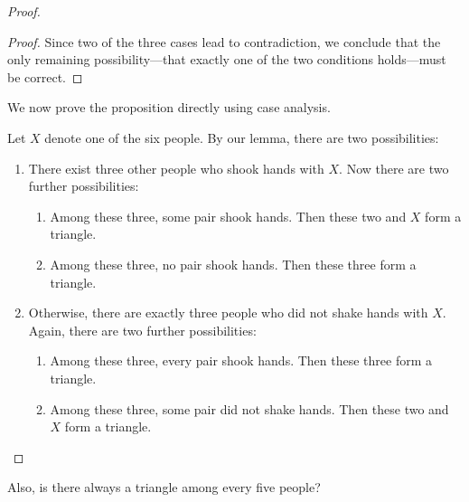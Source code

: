 \documentclass[twoside,12pt]{article}
\begin{document}
\begin{problem}{12}
{\begin{proof}
\begin{proof}
Since two of the three cases lead to contradiction, we conclude that the only remaining possibility---that exactly one of the two conditions holds---must be correct.
\end{proof}

We now prove the proposition directly using case analysis. 

Let $X$ denote one of the six people. By our lemma, there
are two possibilities:
%
\begin{enumerate}
\item There exist three other people who shook hands with $X$.  Now
there are two further possibilities:
%
\begin{enumerate}
\item Among these three, some pair shook hands.  Then these two and
$X$ form a triangle.
\item Among these three, no pair shook hands.  Then these three form a
triangle.
\end{enumerate}
%
\item Otherwise, there are exactly three people who did not shake hands with $X$.
Again, there are two further possibilities:
%
\begin{enumerate}
\item Among these three, every pair shook hands.  Then these three
form a triangle.
\item Among these three, some pair did not shake hands.  Then these two
and $X$ form a triangle.
\end{enumerate}
\end{enumerate}
\end{proof}
}

Also, is there always a triangle among every five people?

\eparts

\end{problem}

\end{document}
